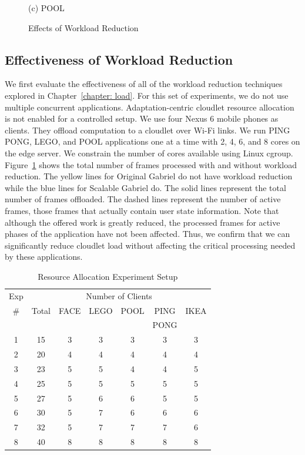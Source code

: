 \begin{figure}
\begin{minipage}[b]{0.3\linewidth}
{(c) POOL}
\end{minipage}
\caption{Effects of Workload Reduction}
\label{figs:workload-reduction}
\end{figure}


\subsection{Effectiveness of Workload Reduction}

We first evaluate the effectiveness of all of the workload reduction techniques
explored in Chapter~\ref{chapter: load}. For this set of experiments, we do not
use multiple concurrent applications. Adaptation-centric cloudlet resource
allocation is not enabled for a controlled setup. We use four Nexus 6 mobile
phones as clients. They offload computation to a cloudlet over Wi-Fi links. We
run PING PONG, LEGO, and POOL applications one at a time with 2, 4, 6, and 8
cores on the edge server. We constrain the number of cores available using Linux
cgroup. Figure~\ref{figs:workload-reduction} shows the total number of frames
processed with and without workload reduction. The yellow lines for Original
Gabriel do not have workload reduction while the blue lines for Scalable Gabriel
do. The solid lines represent the total number of frames offloaded. The dashed
lines represent the number of active frames, those frames that actually contain
user state information. Note that although the offered work is greatly reduced,
the processed frames for active phases of the application have not been
affected. Thus, we confirm that we can significantly reduce cloudlet load
without affecting the critical processing needed by these applications.

\begin{table}[]
\centering
\begin{tabular}{|c|c||c|c|c|c|c|}
  \hline
  Exp & \multicolumn{6}{|c|}{Number of Clients} \\
  \cline{2-7}
  \#  & Total & FACE & LEGO & POOL & PING & IKEA \\
      &      &   &   &  & PONG &  \\ \hline
  1   & 15  & 3 & 3 & 3 & 3 & 3 \\ \hline
  2   & 20  & 4 & 4 & 4 & 4 & 4 \\ \hline
  3   & 23  & 5 & 5 & 4 & 4 & 5\\ \hline
  4   & 25  & 5 & 5 & 5 & 5 & 5 \\ \hline
  5   & 27  & 5 & 6 & 6 & 5 & 5 \\ \hline
  6  & 30  & 5 & 7 & 6 & 6 & 6 \\ \hline
  7  & 32  & 5 & 7 & 7 & 7 & 6 \\ \hline
  8  & 40  & 8 & 8 & 8 & 8 & 8 \\ \hline
\end{tabular}
\vspace{0.1in}
\caption{Resource Allocation Experiment Setup} 
\label{tab:alloc-exps}
\end{table}

